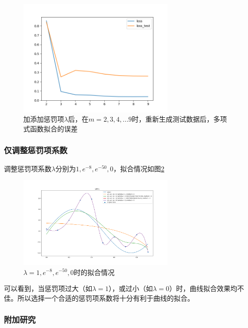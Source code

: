 \begin{figure}[htbp]
    \centering
    \includegraphics[width=0.7\textwidth]{figures/Figure_15.png}
    \caption{加添加惩罚项$\lambda$后，在$m = 2, 3, 4, ... 9$时，重新生成测试数据后，多项式函数拟合的误差}
    \label{mn3}
\end{figure}

\subsubsection{仅调整惩罚项系数}

调整惩罚项系数$\lambda$分别为$1, e^{-8}, e^{-50}, 0$，拟合情况如图\ref{lam}

\begin{figure}[htbp]
    \centering
    \includegraphics[width=0.7\textwidth]{figures/Figure_10.png}
    \caption{$\lambda = 1, e^{-8}, e^{-50}, 0$时的拟合情况}
    \label{lam}
\end{figure}

可以看到，当惩罚项过大（如$\lambda = 1$），或过小（如$\lambda = 0$）时，曲线拟合效果均不佳。所以选择一个合适的惩罚项系数将十分有利于曲线的拟合。

\subsubsection{附加研究}

